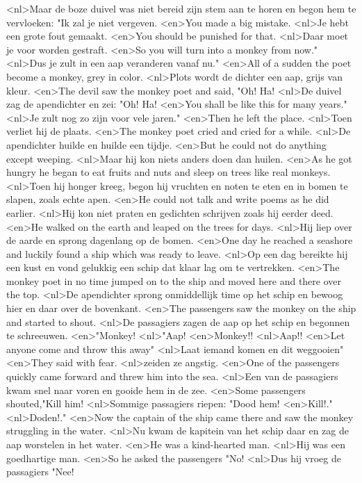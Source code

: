 <nl>Maar de boze duivel was niet bereid zijn stem aan te horen en begon hem te vervloeken: "Ik zal je niet vergeven.
<en>You made a big mistake.
<nl>Je hebt een grote fout gemaakt.
<en>You should be punished for that.
<nl>Daar moet je  voor worden gestraft.
<en>So you will turn into a monkey from now."
<nl>Dus je zult  in een aap veranderen vanaf nu."
<en>All of a sudden the poet become a monkey, grey in color.
<nl>Plots wordt de dichter een aap, grijs van kleur.
<en>The devil saw the monkey poet and said, "Oh! Ha!
<nl>De duivel zag de apendichter en zei: "Oh! Ha!
<en>You shall be like this for many years."
<nl>Je zult nog zo zijn voor vele jaren."
<en>Then he left the place.
<nl>Toen verliet hij de plaats.
<en>The monkey poet cried and cried for a while.
<nl>De apendichter huilde en huilde een tijdje.
<en>But he could not do anything except weeping.
<nl>Maar hij kon niets anders doen dan huilen.
<en>As he got hungry he began to eat  fruits and nuts and sleep on trees like real monkeys.
<nl>Toen hij honger kreeg, begon hij  vruchten en noten te eten en in  bomen te slapen, zoals echte apen.
<en>He could not talk and write poems as he did earlier.
<nl>Hij kon niet praten en gedichten schrijven zoals hij eerder deed.
<en>He walked on the earth and leaped on the trees for days.
<nl>Hij liep over de aarde en sprong dagenlang op de bomen.
<en>One day he reached a seashore and luckily found a ship which was ready to leave.
<nl>Op een dag bereikte hij een kust en vond gelukkig een schip dat klaar lag om te vertrekken.
<en>The monkey poet in no time jumped on to the ship and moved here and there over the top.
<nl>De apendichter sprong onmiddellijk time op het schip en bewoog hier en daar over de bovenkant.
<en>The passengers saw the monkey on the ship and started to shout.
<nl>De passagiers zagen de aap op het schip en begonnen te schreeuwen.
<en>"Monkey!
<nl>"Aap!
<en>Monkey!!
<nl>Aap!!
<en>Let anyone come and throw this away"
<nl>Laat iemand komen en dit weggooien"
<en>They said with fear.
<nl>zeiden ze  angstig.
<en>One of the passengers quickly came forward and threw him into the sea.
<nl>Een van de passagiers kwam snel naar voren en gooide hem in de zee.
<en>Some passengers shouted,"Kill him!
<nl>Sommige passagiers riepen: "Dood hem!
<en>Kill!."
<nl>Doden!."
<en>Now the captain of the ship came there and saw the monkey struggling in the water.
<nl>Nu kwam de kapitein van het schip daar en zag de aap worstelen in het water.
<en>He was a kind-hearted man.
<nl>Hij was een goedhartige man.
<en>So he asked the passengers "No!
<nl>Dus hij vroeg de passagiers "Nee!
